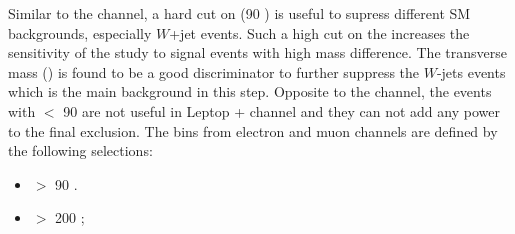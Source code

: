 Similar to the \tauTau channel, a hard cut on \mttwo (90 \GeV) is useful to supress different SM backgrounds, especially $W$+jet events.
Such a high cut on the \mttwo increases the sensitivity of the study to signal events with high mass difference. The \Tau transverse mass (\tauMT)
is found to be a good discriminator to further suppress the $W$-jets events which is the main background in this step. 
Opposite to the \tauTau channel, the events with \mttwo $<$ 90 \GeV are not useful in Leptop + \Tau channel and they can not add any power to 
the final exclusion. The bins from electron \Tau and muon \Tau channels are defined by the following selections:
\begin{itemize}
\item \mttwo $>$ 90 \GeV.
\item \tauMT $>$ 200 \GeV; 
\end{itemize}


